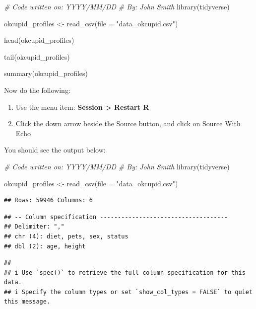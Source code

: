 \documentclass[
]{krantz}
\makeatletter
\newenvironment{Shaded}{\begin{snugshade}}{\end{snugshade}}
\newcommand{\AttributeTok}[1]{\textcolor[rgb]{0.61,0.61,0.61}{#1}}
\newcommand{\CommentTok}[1]{\textcolor[rgb]{0.37,0.37,0.37}{\textit{#1}}}
\newcommand{\FunctionTok}[1]{\textcolor[rgb]{0,0,0}{#1}}
\newcommand{\NormalTok}[1]{#1}
\newcommand{\OtherTok}[1]{\textcolor[rgb]{0.37,0.37,0.37}{#1}}
\newcommand{\StringTok}[1]{\textcolor[rgb]{0.5,0.5,0.5}{#1}}
\providecommand{\tightlist}{%
  \setlength{\itemsep}{0pt}\setlength{\parskip}{0pt}}
\newenvironment{kframe}{%
\medskip{}
\setlength{\fboxsep}{.8em}
 \def\at@end@of@kframe{}%
 \ifinner\ifhmode%
  \def\at@end@of@kframe{\end{minipage}}%
  \begin{minipage}{\columnwidth}%
 \fi\fi%
 \def\FrameCommand##1{\hskip\@totalleftmargin \hskip-\fboxsep
 \colorbox{shadecolor}{##1}\hskip-\fboxsep
     \hskip-\linewidth \hskip-\@totalleftmargin \hskip\columnwidth}%
 \MakeFramed {\advance\hsize-\width
   \@totalleftmargin\z@ \linewidth\hsize
   \@setminipage}}%
 {\par\unskip\endMakeFramed%
 \at@end@of@kframe}
\renewenvironment{Shaded}{\begin{kframe}}{\end{kframe}}
\makeatother
\begin{document}
\begin{Shaded}
\begin{Highlighting}[]
\CommentTok{\# Code written on: YYYY/MM/DD }
\CommentTok{\# By: John Smith}
\FunctionTok{library}\NormalTok{(tidyverse)}

\NormalTok{okcupid\_profiles }\OtherTok{\textless{}{-}} \FunctionTok{read\_csv}\NormalTok{(}\AttributeTok{file =} \StringTok{"data\_okcupid.csv"}\NormalTok{)}

\FunctionTok{head}\NormalTok{(okcupid\_profiles)}

\FunctionTok{tail}\NormalTok{(okcupid\_profiles)}

\FunctionTok{summary}\NormalTok{(okcupid\_profiles)}
\end{Highlighting}
\end{Shaded}

Now do the following:

\begin{enumerate}
\def\labelenumi{\arabic{enumi}.}
\tightlist
\item
  Use the menu item: \textbf{Session \textgreater{} Restart R}
\item
  Click the down arrow beside the Source button, and click on Source With Echo
\end{enumerate}

You should see the output below:

\begin{Shaded}
\begin{Highlighting}[]
\CommentTok{\# Code written on: YYYY/MM/DD }
\CommentTok{\# By: John Smith}
\FunctionTok{library}\NormalTok{(tidyverse)}

\NormalTok{okcupid\_profiles }\OtherTok{\textless{}{-}} \FunctionTok{read\_csv}\NormalTok{(}\AttributeTok{file =} \StringTok{"data\_okcupid.csv"}\NormalTok{)}
\end{Highlighting}
\end{Shaded}

\begin{verbatim}
## Rows: 59946 Columns: 6
\end{verbatim}

\begin{verbatim}
## -- Column specification ------------------------------------
## Delimiter: ","
## chr (4): diet, pets, sex, status
## dbl (2): age, height
\end{verbatim}

\begin{verbatim}
## 
## i Use `spec()` to retrieve the full column specification for this data.
## i Specify the column types or set `show_col_types = FALSE` to quiet this message.
\end{verbatim}
\end{document}
